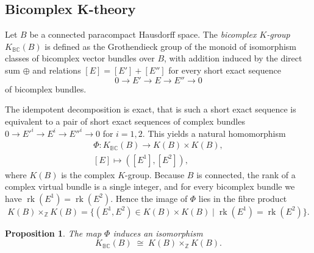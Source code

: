 \documentclass[11pt]{amsart}
\newtheorem{prop}{Proposition}[section]   %
\theoremstyle{definition}
\begin{document}
\subsection{Bicomplex K-theory}\label{subsec:bicomplex_K}

Let $B$ be a connected paracompact Hausdorff space. The \emph{bicomplex $K$-group} $K_{\mathbb{B}\mathbb{C}}(B)$ is defined as the Grothendieck group of the monoid of isomorphism classes of bicomplex vector bundles over $B$, with addition induced by the direct sum $\oplus$ and relations $[E]=[E']+[E'']$ for every short exact sequence
\begin{equation*}
0\longrightarrow E'\longrightarrow E\longrightarrow E''\longrightarrow 0
\end{equation*}
of bicomplex bundles.

The idempotent decomposition is exact, that is such a short exact sequence is equivalent to a pair of short exact sequences of complex bundles $0\to E'^{i}\to E^{i}\to E''^{i}\to 0$ for $i=1,2$. This yields a natural homomorphism
\begin{gather*}
\Phi:K_{\mathbb{B}\mathbb{C}}(B)\to K(B)\times K(B),\\
[E]\mapsto ([E^{1}],[E^{2}]),
\end{gather*}
where $K(B)$ is the complex $K$-group. Because $B$ is connected, the rank of a complex virtual bundle is a single integer, and for every bicomplex bundle we have $\operatorname{rk}(E^{1})=\operatorname{rk}(E^{2})$. Hence the image of $\Phi$ lies in the fibre product
\begin{equation*}
K(B)\times_{\mathbb{Z}}K(B)
=\bigl\{(E^{1},E^{2})\in K(B)\times K(B)\mid 
\operatorname{rk}(E^{1})=\operatorname{rk}(E^{2})\bigr\}.
\end{equation*}

\begin{prop}\label{prop:K_is_fibre_product}
The map $\Phi$ induces an isomorphism
\begin{equation*}
K_{\mathbb{B}\mathbb{C}}(B)\;\cong\;K(B)\times_{\mathbb{Z}}K(B).
\end{equation*}
\end{prop}
\end{document}

